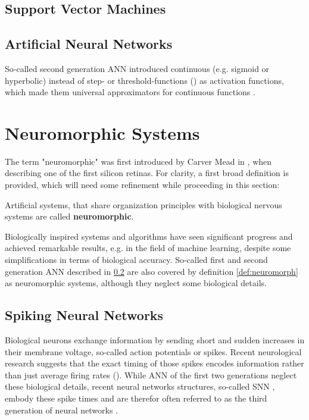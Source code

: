\subsection{Support Vector Machines}
\subsection{Artificial Neural Networks}
\label{subsec:ML_ANN}
So-called second generation \ac{ANN} introduced continuous (e.g. sigmoid or hyperbolic) instead of step- or threshold-functions () as activation functions, which made them universal approximators for continuous functions \cite{Cybenko1989}.
\section{Neuromorphic Systems}
The term "neuromorphic" was first introduced by Carver Mead in \cite{Mead90}, when describing one of the first silicon retinas.
For clarity, a first broad definition is provided, which will need some refinement while proceeding in this section:
\begin{defn}
\label{def:neuromorph}
Artificial systems, that share organization principles with biological nervous systems are called \textbf{neuromorphic}.
\end{defn} 
Biologically inspired systems and algorithms have seen significant progress and achieved remarkable results, e.g. in the field of machine learning, despite some simplifications in terms of biological accuracy.
So-called first and second generation \ac{ANN} described in \ref{subsec:ML_ANN} are also covered by definition \ref{def:neuromorph} as neuromorphic systems, although they neglect some biological details.
\subsection{Spiking Neural Networks}
Biological neurons exchange information by sending short and sudden increases in their membrane voltage, so-called action potentials or spikes.
Recent neurological research suggests that the exact timing of those spikes encodes information rather than just average firing rates ().
While \ac{ANN} of the first two generations neglect these biological details, recent neural networks structures, so-called \ac{SNN} \cite{Paugam2009}, embody these spike times and are therefor often referred to as the third generation of neural networks . 



